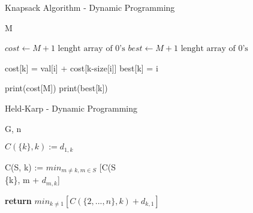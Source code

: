 \documentclass{article}
\begin{document}
\begin{algorithm}[h]
\caption{Knapsack Algorithm - Dynamic Programming}
\begin{algorithmic}[1]

 {M}

\State $cost \gets M + 1 \text{ lenght array of 0's}$
\State $best \gets M + 1 \text{ lenght array of 0's}$

			\State cost[k] = val[i] + cost[k-size[i]]
			\State best[k] = i
		\EndIf
	\EndFor
\EndFor

\State print(cost[M])
	\State print(best[k])
\EndFor

\EndProcedure

\end{algorithmic}
\end{algorithm}

\begin{algorithm}[h]
\caption{Held-Karp - Dynamic Programming}
\begin{algorithmic}[1]

 {G, n}

	\State $C(\{k\}, k) := d _{1, k}$
\EndFor

			\State C(S, k) := $min_{m \neq k, m \in S}$ [C(S\\\{k\}, m + $d_{m, k}$]
		\EndFor
	\EndFor
\EndFor

\State \textbf{return}  $min_{k \neq 1} [C(\{2, ..., n\}, k) + d_{k, 1}]$

\EndProcedure

\end{algorithmic}
\end{algorithm}
\end{document}
